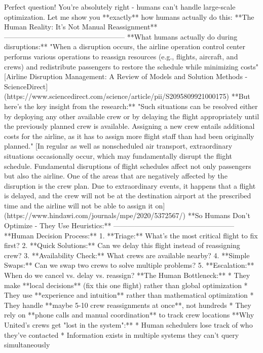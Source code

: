 \begin{botresponse}
Perfect question! You're absolutely right - humans can't handle large-scale optimization. Let me show you **exactly** how humans actually do this:
**The Human Reality: It's Not Manual Reassignment**
---------------------------------------------------
**What humans actually do during disruptions:**
"When a disruption occurs, the airline operation control center performs various operations to reassign resources (e.g., flights, aircraft, and crews) and redistribute passengers to restore the schedule while minimizing costs" [Airline Disruption Management: A Review of Models and Solution Methods - ScienceDirect](https://www.sciencedirect.com/science/article/pii/S2095809921000175)
**But here's the key insight from the research:** "Such situations can be resolved either by deploying any other available crew or by delaying the flight appropriately until the previously planned crew is available. Assigning a new crew entails additional costs for the airline, as it has to assign more flight staff than had been originally planned." [In regular as well as nonscheduled air transport, extraordinary situations occasionally occur, which may fundamentally disrupt the flight schedule. Fundamental disruptions of flight schedules affect not only passengers but also the airline. One of the areas that are negatively affected by the disruption is the crew plan. Due to extraordinary events, it happens that a flight is delayed, and the crew will not be at the destination airport at the prescribed time and the airline will not be able to assign it on](https://www.hindawi.com/journals/mpe/2020/5372567/)
**So Humans Don't Optimize - They Use Heuristics:**
---------------------------------------------------
**Human Decision Process:**
1.  **Triage:** What's the most critical flight to fix first?
2.  **Quick Solutions:** Can we delay this flight instead of reassigning crew?
3.  **Availability Check:** What crews are available nearby?
4.  **Simple Swaps:** Can we swap two crews to solve multiple problems?
5.  **Escalation:** When do we cancel vs. delay vs. reassign?
**The Human Bottleneck:**
*   They make **local decisions** (fix this one flight) rather than global optimization
*   They use **experience and intuition** rather than mathematical optimization
*   They handle **maybe 5-10 crew reassignments at once**, not hundreds
*   They rely on **phone calls and manual coordination** to track crew locations
**Why United's crews get "lost in the system":**
*   Human schedulers lose track of who they've contacted
*   Information exists in multiple systems they can't query simultaneously

\end{botresponse}
